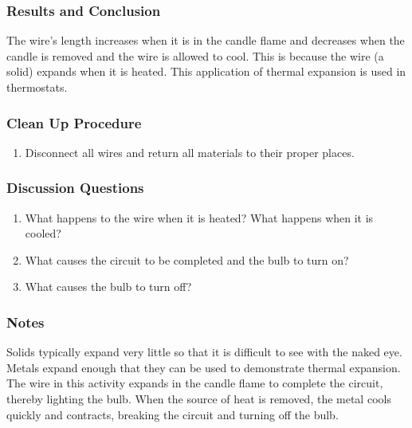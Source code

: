 \subsubsection*{Results and Conclusion}
The wire's length increases when it is in the candle flame and decreases when the candle is removed and the wire is allowed to cool. This is because the wire (a solid) expands when it is heated. This application of thermal expansion is used in thermostats.  

\subsubsection*{Clean Up Procedure}
\begin{enumerate}
\item{Disconnect all wires and return all materials to their proper places.} 
\end{enumerate}

\subsubsection*{Discussion Questions}
\begin{enumerate}
\item{What happens to the wire when it is heated? What happens when it is cooled?}
\item{What causes the circuit to be completed and the bulb to turn on?}
\item{What causes the bulb to turn off?}
\end{enumerate}

\subsubsection*{Notes}
Solids typically expand very little so that it is difficult to see with the naked eye. Metals expand enough that they can be used to demonstrate thermal expansion. The wire in this activity expands in the candle flame to complete the circuit, thereby lighting the bulb. When the source of heat is removed, the metal cools quickly and contracts, breaking the circuit and turning off the bulb.
